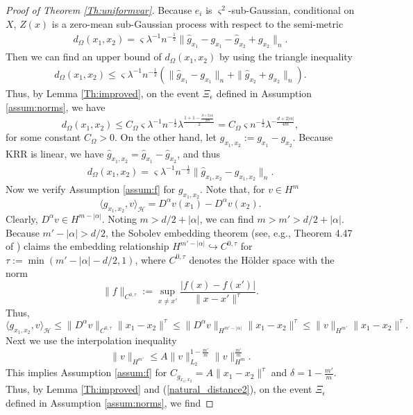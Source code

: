 \documentclass[12pt]{article}
\theoremstyle{plain}
\theoremstyle{remark}
\begin{document}
\begin{proof}[Proof of Theorem \ref{Th:uniformvar}]
Because $e_i$ is $\varsigma^2$-sub-Gaussian, conditional on $X$, $Z(x)$ is a zero-mean sub-Gaussian process with respect to the semi-metric 
\begin{eqnarray}\label{natural_distance1}
    d_\Omega(x_1,x_2)=\varsigma\lambda^{-1}n^{-\frac{1}{2}}\|\hat{g}_{x_1}-g_{x_1}-\hat{g}_{x_2}+g_{x_2}\|_n.
\end{eqnarray}
Then we can find an upper bound of $d_\Omega(x_1,x_2)$ by using the triangle inequality
\begin{eqnarray*}
    d_\Omega(x_1,x_2)\leq \varsigma\lambda^{-1}n^{-\frac{1}{2}}\left(\|\hat{g}_{x_1}-g_{x_1}\|_n+\|\hat{g}_{x_2}+g_{x_2}\|_n\right).
\end{eqnarray*}
Thus, by Lemma \ref{Th:improved}, on the event $\Xi_\epsilon$ defined in Assumption \ref{assum:norms}, we have
\[d_\Omega(x_1,x_2)\leq C_\Omega \varsigma\lambda^{-1}n^{-\frac{1}{2}} \lambda^{\frac{1+1-\frac{d+2|\alpha|}{2m}}{2}}=C_\Omega \varsigma n^{-\frac{1}{2}}\lambda^{-\frac{d+2|\alpha|}{4m}}, \]
for some constant $C_\Omega>0$.
On the other hand, let $g_{x_1,x_2}:=g_{x_1}-g_{x_2}$. Because KRR is linear, we have $\hat{g}_{x_1,x_2}=\hat{g}_{x_1}-\hat{g}_{x_2}$, and thus
\begin{eqnarray}\label{natural_distance2}
    d_\Omega(x_1,x_2)
    =\varsigma\lambda^{-1}n^{-\frac{1}{2}}\|\hat{g}_{x_1,x_2}-g_{x_1,x_2}\|_n.
\end{eqnarray}
Now we verify Assumption \ref{assum:f} for $g_{x_1,x_2}$. Note that, for $v\in H^m$
\[\langle g_{x_1,x_2},v\rangle_\mathcal{H}=D^\alpha v(x_1)-D^\alpha v(x_2).\]
Clearly, $D^\alpha v\in H^{m-|\alpha|}$. Noting $m>d/2+|\alpha|$, we can find $m>m'>d/2+|\alpha|$. Because $m'-|\alpha|>d/2$, the Sobolev embedding theorem (see, e.g., Theorem 4.47 of \cite{demengel2012functional}) claims the embedding relationship $H^{m'-|\alpha|}\hookrightarrow  C^{0,\tau}$ for $\tau:=\min(m'-|\alpha|-d/2,1)$, where $C^{0,\tau}$ denotes the H\"older space with the norm
\[\|f\|_{C^{0,\tau}}:=\sup_{x\neq x'}\frac{|f(x)-f(x')|}{\|x-x'\|^\tau}.\]
Thus, 
\[\langle g_{x_1,x_2},v\rangle_\mathcal{H}\leq \|D^\alpha v\|_{C^{0,\tau}}\|x_1-x_2\|^\tau\leq \|D^\alpha v\|_{H^{m'-|\alpha|}}\|x_1-x_2\|^\tau\leq \|v\|_{H^{m'}}\|x_1-x_2\|^\tau.\]
Next we use the interpolation inequality
\[\|v\|_{H^{m'}}\leq A \|v\|_{L_2}^{1-\frac{m'}{m}}\|v\|_{H^m}^{\frac{m'}{m}}.\]
This implies Assumption \ref{assum:f} for $C_{g_{x_1,x_2}}=A \|x_1-x_2\|^\tau$ and $\delta=1-\frac{m'}{m}$. Thus, by Lemma \ref{Th:improved} and (\ref{natural_distance2}), on the event $\Xi_\epsilon$ defined in Assumption \ref{assum:norms}, we find

\end{proof}
\end{document}
